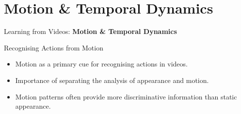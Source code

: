 \section{Motion \& Temporal Dynamics}
\begin{frame}{}
    \LARGE Learning from Videos: \textbf{Motion \& Temporal Dynamics}
\end{frame}

\begin{frame}{Recognising Actions from Motion}
    \begin{itemize}
        \item Motion as a primary cue for recognising actions in videos.
        \item Importance of separating the analysis of appearance and motion.
        \item Motion patterns often provide more discriminative information than static appearance.
    \end{itemize}
\end{frame}








